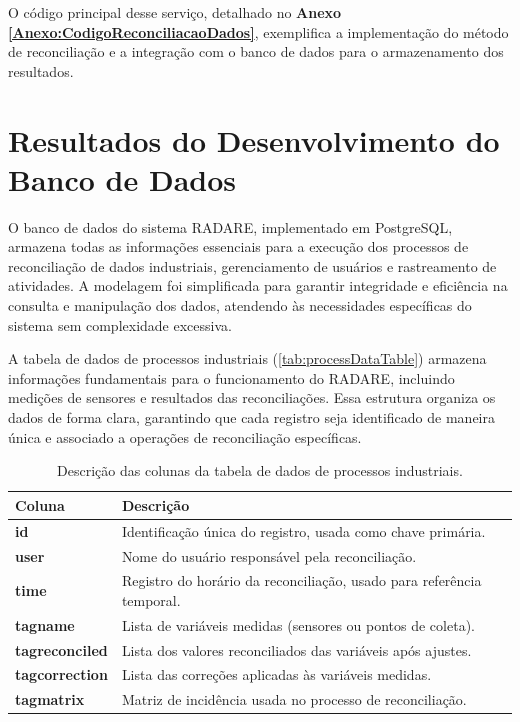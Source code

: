 O código principal desse serviço, detalhado no \textbf{Anexo \ref{Anexo:CodigoReconciliacaoDados}}, exemplifica a implementação do método de reconciliação e a integração com o banco de dados para o armazenamento dos resultados.

\section{Resultados do Desenvolvimento do Banco de Dados}

O banco de dados do sistema RADARE, implementado em PostgreSQL, armazena todas as informações essenciais para a execução dos processos de reconciliação de dados industriais, gerenciamento de usuários e rastreamento de atividades. A modelagem foi simplificada para garantir integridade e eficiência na consulta e manipulação dos dados, atendendo às necessidades específicas do sistema sem complexidade excessiva.

A tabela de dados de processos industriais (\autoref{tab:processDataTable}) armazena informações fundamentais para o funcionamento do RADARE, incluindo medições de sensores e resultados das reconciliações. Essa estrutura organiza os dados de forma clara, garantindo que cada registro seja identificado de maneira única e associado a operações de reconciliação específicas.

\begin{table}[htbp]
    \centering
    \caption{Descrição das colunas da tabela de dados de processos industriais.}
    \label{tab:processDataTable}
    \begin{tabular}{|l|p{10cm}|}
        \hline
        \textbf{Coluna} & \textbf{Descrição} \\ \hline
        \textbf{id} & Identificação única do registro, usada como chave primária. \\ \hline
        \textbf{user} & Nome do usuário responsável pela reconciliação. \\ \hline
        \textbf{time} & Registro do horário da reconciliação, usado para referência temporal. \\ \hline
        \textbf{tagname} & Lista de variáveis medidas (sensores ou pontos de coleta). \\ \hline
        \textbf{tagreconciled} & Lista dos valores reconciliados das variáveis após ajustes. \\ \hline
        \textbf{tagcorrection} & Lista das correções aplicadas às variáveis medidas. \\ \hline
        \textbf{tagmatrix} & Matriz de incidência usada no processo de reconciliação. \\ \hline
    \end{tabular}
\end{table}
